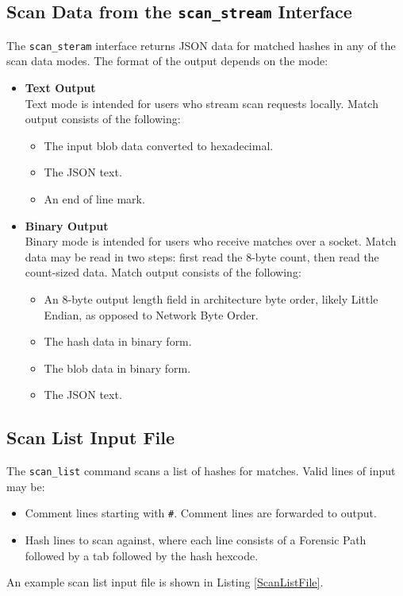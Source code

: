 \documentclass[11pt,fleqn]{article} %
\begin{document}
\subsection{Scan Data from the \texttt{scan\_stream} Interface}
The \verb+scan_steram+ interface returns JSON data for matched hashes in any of the scan data modes. The format of the output depends on the mode:
\begin{itemize}
\item \textbf{Text Output}\\
Text mode is intended for users who stream scan requests locally. Match output consists of the following:
  \begin{itemize}
  \item The input blob data converted to hexadecimal.
  \item The JSON text.
  \item An end of line mark.
  \end{itemize}
\item \textbf{Binary Output}\\
Binary mode is intended for users who receive matches over a socket. Match data may be read in two steps: first read the 8-byte count, then read the count-sized data. Match output consists of the following:
  \begin{itemize}
  \item An 8-byte output length field in architecture byte order, likely Little Endian, as opposed to Network Byte Order.
  \item The hash data in binary form.
  \item The blob data in binary form.
  \item The JSON text.
  \end{itemize}
\end{itemize}

\subsection{Scan List Input File}
\label{ScanListInputFile}
The \verb+scan_list+ command scans a list of hashes for matches.  Valid lines of input may be:
\begin{itemize}
\item Comment lines starting with \verb+#+.  Comment lines are forwarded to output.
\item Hash lines to scan against, where each line consists of a Forensic Path followed by a tab followed by the hash hexcode.
\end{itemize}
An example scan list input file is shown in Listing \ref{ScanListFile}.\\
\end{document}
